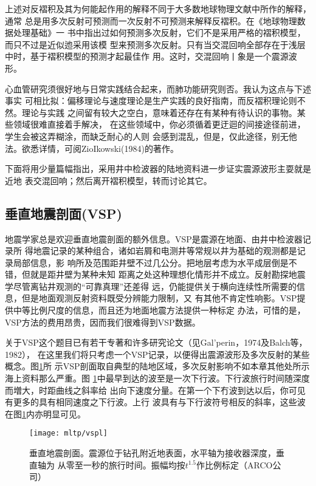 上述对反褶积及其为何能起作用的解释不同于大多数地球物理文献中所作的解释，通常
总是用多次反射可预测而一次反射不可预测来解释反褶积。在《地球物理数据处理基础》一
书中指出过如何预测多次反射，它们不是采用严格的褶积模型，而只不过是近似迆采用该模
型来预测多次反射。只有当交混回响全部存在于浅层中时，基于褶积模型的预测才起最佳作
用。这时，交混回响丨象是一个震源波形。

心血管研究须很好地与日常实践结合起来，而肺功能研究则否。我认为这点与下述事实
可相比拟：偏移理论与速度理论是生产实践的良好指南，而反褶积理论则不然。理论与实践
之间留有较大之空白，意味着还存在有某种有待认识的事物。某些领域很难直接着手解决，
在这些领域中，你必须循着更迂迴的间接途径前进，学生会被这弄糊涂，而缺乏耐心的人则
会感到混乱，但是，仅此途径，别无他法。欲悉详情，可阅ZioIkowski(1984)的著作。

下面将用少量篇幅指出，采用井中检波器的陆地资料进一步证实震源波形主耍就是近地
表交混回响；然后离开褶积模型，转而讨论其它。

\subsection{垂直地震剖面(VSP)}
\label{sec:5.5.3}

地震学家总是欢迎垂直地震剖面的额外信息。VSP是震源在地面、由井中检波器记录所
得地震记录的某种组合，诸如岩屑和电测井等常规以井为基础的观测都是记录局部信息，影
响所及范围距井壁不过几公分。把地层考虑为水平成层倒是不错，但就是距井壁为某种未知
距离之处这种理想化情形并不成立。反射勘探地震学尽管离钻井观测的“可靠真理”还差得
远，仍能提供关于横向连续性所需要的信息，但是地面观测反射资料既受分辨能力限制，又
有其他不肯定性响影。VSP提供中等比例尺度的信息，而且还为地面地震方法提供一种标定
办法，可惜的是，VSP方法的费用昂贵，因而我们很难得到VSP数据。

关于VSP这个题目已有若干专著和许多研究论文（见Gal'perin，1974及Balch等，1982），
在这里我们将只考虑一个VSP记录，以便得出震源波形及多次反射的某些概念。图\ref{fig:mltp/vspl}所
示VSP剖面取自典型的陆地区域，多次反射影响不如本章其他处所示海上资料那么严重。图
\ref{fig:mltp/vspl}中最早到达的波至是一次下行波。下行波旅行时间随深度而増大，时距曲线之斜率给
出向下速度分量。在第一个下冇波到达以后，你可见有更多的具有相同速度之下行波。上行
波具有与下行波符号相反的斜率，这些波在图\ref{fig:mltp/vspl}内亦明显可见。
\begin{figure}[H]
\centering
\texttt{[image: mltp/vspl]}
\caption[vspl]{
垂直地震剖面。震源位于钻孔附近地表面，水平轴为接收器深度，垂直轴为
从零至一秒的旅行时间。振幅均按$t^{1.5}$作比例标定（ARCO公司）
}
\label{fig:mltp/vspl}
\end{figure}


